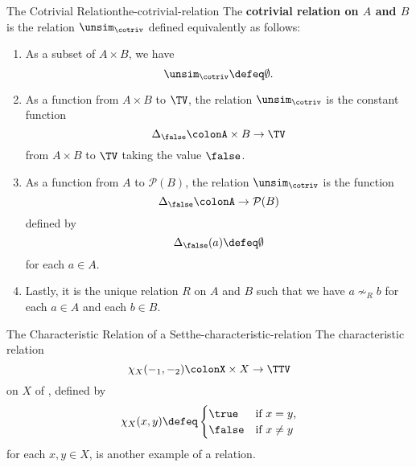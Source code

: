 \begin{example}{The Cotrivial Relation}{the-cotrivial-relation}%
    The \textbf{cotrivial relation on $A$ and $B$} is the relation $\unsim_{\cotriv}$ defined equivalently as follows:%
    \begin{enumerate}
        \item As a subset of $A\times B$, we have
            \[
                \unsim_{\cotriv}%
                \defeq%
                \emptyset.%
            \]%
        \item As a function from $A\times B$ to $\TV$, the relation $\unsim_{\cotriv}$ is the constant function
            \[%
                \Delta_{\false}%
                \colon%
                A\times B%
                \to%
                \TV%
            \]%
            from $A\times B$ to $\TV$ taking the value $\false$.
        \item As a function from $A$ to $\mathcal{P}(B)$, the relation $\unsim_{\cotriv}$ is the function
            \[%
                \Delta_{\false}%
                \colon%
                A%
                \to%
                \mathcal{P}(B)%
            \]%
            defined by
            \[
                \Delta_{\false}(a)%
                \defeq%
                \emptyset%
            \]%
            for each $a\in A$.
        \item Lastly, it is the unique relation $R$ on $A$ and $B$ such that we have $a\nsim_{R}b$ for each $a\in A$ and each $b\in B$.
    \end{enumerate}
\end{example}
\begin{example}{The Characteristic Relation of a Set}{the-characteristic-relation}%
    The characteristic relation
    \[%
        \chi_{X}(-_{1},-_{2})%
        \colon%
        X\times X%
        \to%
        \TTV%
    \]%
    on $X$ of , defined by%
    \[
        \chi_{X}(x,y)
        \defeq
        \begin{cases}
            \true  &\text{if $x=y$,}\\
            \false &\text{if $x\neq y$}
        \end{cases}
    \]%
    for each $x,y\in X$, is another example of a relation.
\end{example}
